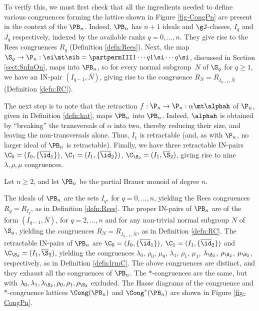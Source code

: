 To verify this, we must first check that all the ingredients needed to define various congruences forming the lattice shown in Figure \ref{fig-CongPn} are present in the context of the $\PB_n$. Indeed, $\PB_n$ has $n+1$ ideals and $\gJ$-classes, $I_q$ and $J_q$ respectively, indexed by the available ranks $q=0,\dots, n$.
They give rise to the Rees congruences $R_q$ (Definition \ref{defn:Rees}).
Next, the map $\S_q\to\P_n:\si\mt\sib=\partpermIII1\cdots q{1\si}\cdots{q\si}$, discussed in Section \ref{sect:SnInOn}, maps into $\PB_n$, so for every normal subgroup~$N$ of $ \S_q$ for $q\geq1$, we have an IN-pair $(I_{q-1},\overline{N})$, giving rise to the congruence $R_N=R_{I_{q-1},\overline N}$ (Definition \ref{defn:RC}).
%


The next step is to note that the retraction $f:\P_n\to\P_n:\alpha\mt\alphah$ of $\P_n$, given in Definition \ref{defn:hat}, maps $\PB_n$ into $\PB_n$.  Indeed, $\alphah$ is obtained by ``breaking'' the transversals of $\alpha$ into two, thereby reducing their size, and leaving the non-transversals alone.  Thus, $I_1$ is retractable (and, as with $\P_n$, no larger ideal of $\PB_n$ is retractable).  Finally, we have three retractable IN-pairs $\C_0=(I_0,\{\overline{\id}_1\})$, $\C_1=(I_1,\{\overline{\id}_2\})$, $\C_{\S_2}=(I_1,\overline{\S}_2)$, giving rise to nine $\lambda,\rho,\mu$ congruences.





\begin{thm}\label{thm-CongPBn}
Let $n\geq2$, and let $\PB_n$ be the partial Brauer monoid of degree $n$.  
\begin{itemize}
 The ideals of $\PB_n$ are the sets $I_q$, for $q=0,\ldots,n$, yielding the Rees congruences $R_q=R_{I_q}$, as in Definition \ref{defn:Rees}.
 The proper IN-pairs of $\PB_n$ are of the form $(I_{q-1},\overline N)$, for $q=2,\ldots,n$ and for any non-trivial normal subgroup $N$ of $\S_q$, yielding the congruences $R_N=R_{I_{q-1},\overline N}$, as in Definition \ref{defn:RC}.
 The retractable IN-pairs of $\PB_n$ are $\C_0=(I_0,\{\overline{\id}_1\})$, $\C_1=(I_1,\{\overline{\id}_2\})$ and $\C_{\S_2}=(I_1,\overline{\S}_2)$, yielding the congruences $\lambda_0$, $\rho_0$, $\mu_0$, $\lambda_1$, $\rho_1$, $\mu_1$, $\lambda_{\S_2}$, $\rho_{\S_2}$, $\mu_{\S_2}$, respectively, as in Definition \ref{defn:lrmC}.
 The above congruences are distinct, and they exhaust all the congruences of $\PB_n$.
 The $\ast$-congruences are the same, but with $\lambda_0,\lambda_1,\lambda_{\S_2},\rho_0,\rho_1,\rho_{\S_2}$ excluded.
 The Hasse diagrams of the congruence and $*$-congruence lattices $\Cong(\PB_n)$ and $\Cong^*(\PB_n)$ are shown in Figure \ref{fig-CongPn}.
\end{itemize}
\end{thm}





